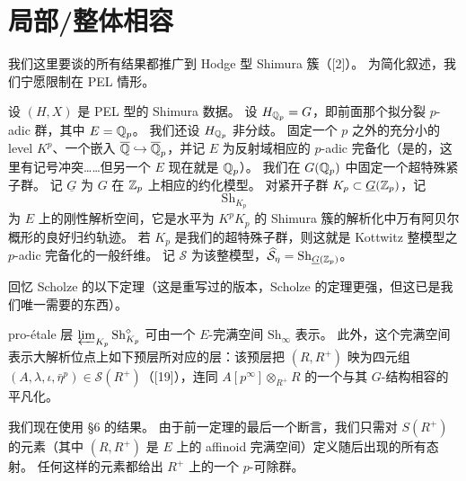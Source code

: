 \section{局部/整体相容}
\label{sec:compat}

我们这里要谈的所有结果都推广到 Hodge 型 Shimura 簇（[2]）。
为简化叙述，我们宁愿限制在 PEL 情形。

设 $(H,X)$ 是 PEL 型的 Shimura 数据。
设 $H_{\mathbb{Q}_p}=G$，即前面那个拟分裂 $p$-adic 群，其中 $E=\mathbb{Q}_p$。
我们还设 $H_{\mathbb{Q}_p}$ 非分歧。
固定一个 $p$ 之外的充分小的 level $K^p$、一个嵌入 $\overline{\mathbb{Q}}\hookrightarrow\overline{\mathbb{Q}}_p$，并记 $E$ 为反射域相应的 $p$-adic 完备化（是的，这里有记号冲突……但另一个 $E$ 现在就是 $\mathbb{Q}_p$）。
我们在 $G(\mathbb{Q}_p)$ 中固定一个超特殊紧子群。
记 $\underline{G}$ 为 $G$ 在 $\mathbb{Z}_p$ 上相应的约化模型。
对紧开子群 $K_p\subset\underline{G}(\mathbb{Z}_p)$，记
\[
\mathrm{Sh}_{K_p}
\]
为 $E$ 上的刚性解析空间，它是水平为 $K^pK_p$ 的 Shimura 簇的解析化中万有阿贝尔概形的良好归约轨迹。
若 $K_p$ 是我们的超特殊子群，则这就是 Kottwitz 整模型之 $p$-adic 完备化的一般纤维。
记 $\mathcal{S}$ 为该整模型，$\widehat{\mathcal{S}}_\eta=\mathrm{Sh}_{\underline{G}(\mathbb{Z}_p)}$。

回忆 Scholze 的以下定理（这是重写过的版本，Scholze 的定理更强，但这已是我们唯一需要的东西）。

\begin{theorem}[{[28]}]
pro-étale 层 $\varprojlim_{K_p}\mathrm{Sh}^\diamond_{K_p}$ 可由一个 $E$-完满空间 $\mathrm{Sh}_\infty$ 表示。
此外，这个完满空间表示大解析位点上如下预层所对应的层：该预层把 $(R,R^+)$ 映为四元组 $(A,\lambda,\iota,\bar\eta^p)\in\mathcal{S}(R^+)$（[19]），连同 $A[p^\infty]\otimes_{R^+}R$ 的一个与其 $G$-结构相容的平凡化。
\end{theorem}

我们现在使用 §6 的结果。
由于前一定理的最后一个断言，我们只需对 $S(R^+)$ 的元素（其中 $(R,R^+)$ 是 $E$ 上的 affinoid 完满空间）定义随后出现的所有态射。
任何这样的元素都给出 $R^+$ 上的一个 $p$-可除群。

